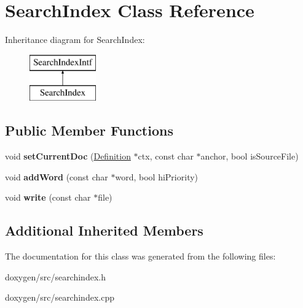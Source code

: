 \hypertarget{class_search_index}{}\section{Search\+Index Class Reference}
\label{class_search_index}
Inheritance diagram for Search\+Index\+:\begin{figure}[H]
\begin{center}
\leavevmode
\includegraphics[height=2.000000cm]{class_search_index}
\end{center}
\end{figure}
\subsection*{Public Member Functions}
\begin{DoxyCompactItemize}
\item 
\mbox{\label{class_search_index_a805db5eec11f404b16f5ae2f23c9664b}} 
void {\bfseries set\+Current\+Doc} (\mbox{\hyperlink{class_definition}{Definition}} $\ast$ctx, const char $\ast$anchor, bool is\+Source\+File)
\item 
\mbox{\label{class_search_index_a24345f511da7dc5ccc6d12b232f8fb53}} 
void {\bfseries add\+Word} (const char $\ast$word, bool hi\+Priority)
\item 
\mbox{\label{class_search_index_a84c14c8f3e4fd88df1f20363ca307279}} 
void {\bfseries write} (const char $\ast$file)
\end{DoxyCompactItemize}
\subsection*{Additional Inherited Members}


The documentation for this class was generated from the following files\+:\begin{DoxyCompactItemize}
\item 
doxygen/src/searchindex.\+h\item 
doxygen/src/searchindex.\+cpp\end{DoxyCompactItemize}
